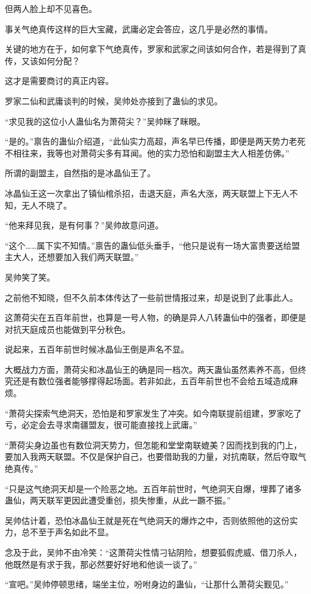 \begin{this_body}
但两人脸上却不见喜色。

事关气绝真传这样的巨大宝藏，武庸必定会答应，这几乎是必然的事情。

关键的地方在于，如何拿下气绝真传，罗家和武家之间该如何合作，若是得到了真传，又该如何分配？

这才是需要商讨的真正内容。

罗家二仙和武庸谈判的时候，吴帅处亦接到了蛊仙的求见。

“求见我的这位小人蛊仙名为萧荷尖？”吴帅眯了眯眼。

“是的。”禀告的蛊仙介绍道，“此仙实力高超，声名早已传播，即便是两天势力老死不相往来，我等也对萧荷尖多有耳闻。他的实力恐怕和副盟主大人相差仿佛。”

所谓的副盟主，自然指的是冰晶仙王了。

冰晶仙王这一次拿出了镇仙棺杀招，击退天庭，声名大涨，两天联盟上下无人不知，无人不晓了。

“他来拜见我，是有何事？”吴帅故意问道。

“这个……属下实不知情。”禀告的蛊仙低头垂手，“他只是说有一场大富贵要送给盟主大人，还想要加入我们两天联盟。”

吴帅笑了笑。

之前他不知晓，但不久前本体传达了一些前世情报过来，却是说到了此事此人。

这萧荷尖在五百年前世，也算是一号人物，的确是异人八转蛊仙中的强者，即便是对抗天庭成员也能做到平分秋色。

说起来，五百年前世时候冰晶仙王倒是声名不显。

大概战力方面，萧荷尖和冰晶仙王的确是同一档次。两天蛊仙虽然素养不高，但终究还是有数位强者能够撑得起场面。若非如此，五百年前世也不会给五域造成麻烦。

“萧荷尖探索气绝洞天，恐怕是和罗家发生了冲突。如今南联提前组建，罗家吃了亏，必定会去寻求南疆盟友，很可能直接找上武庸。”

“萧荷尖身边虽也有数位洞天势力，但怎能和堂堂南联媲美？因而找到我的门上，要加入我两天联盟。不仅是保护自己，也要借助我的力量，对抗南联，然后夺取气绝真传。”

“只是这气绝洞天却是一个险恶之地。五百年前世时，气绝洞天自爆，埋葬了诸多蛊仙，两天联军更因此遭受重创，损失惨重，从此一蹶不振。”

吴帅估计着，恐怕冰晶仙王就是死在气绝洞天的爆炸之中，否则依照他的这份实力，总不至于声名如此不显。

念及于此，吴帅不由冷笑：“这萧荷尖性情刁钻阴险，想要狐假虎威、借刀杀人，他既然是有求于我，那必然要好好地和他谈一谈了。”

“宣吧。”吴帅停顿思绪，端坐主位，吩咐身边的蛊仙，“让那什么萧荷尖觐见。”

\end{this_body}


